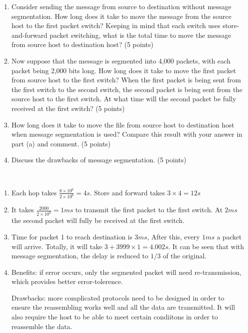 \begin{exercise}[]
{    \begin{enumerate}
        \item Consider sending the message from source to destination without message segmentation. How long does it take to move the message from the source host to the first packet switch? Keeping in mind that each switch uses store-and-forward packet switching, what is the total time to move the message from source host to destination host? (5 points)
        \item  Now suppose that the message is segmented into 4,000 packets, with each packet being 2,000 bits long. How long does it take to move the first packet from source host to the first switch? When the first packet is being sent from the first switch to the second switch, the second packet is being sent from the source host to the first switch. At what time will the second packet be fully received at the first switch? (5 points)
        \item How long does it take to move the file from source host to destination host when message segmentation is used? Compare this result with your answer in part (a) and comment. (5 points)
        \item Discuss the drawbacks of message segmentation. (5 points)
    \end{enumerate}
    }
  \begin{solution}
  \par{~}
  \begin{enumerate}
    \item Each hop takes $\frac{8 \times 10^6}{2\times 10^6} = 4s$. Store and forward takes $3 \times 4 = 12s$
    \item It takes $\frac{2000}{2\times 10^6} = 1ms$ to transmit the first packet to the first switch. At $2ms$ the second packet will fully be received at the first switch.
    \item Time for packet 1 to reach destination is $3ms$, After this, every $1ms$ a packet will arrive. Totally, it will take $3 + 3999 \times 1 = 4.002s$. It can be seen that with message segmentation, the delay is reduced to $1/3$ of the original.
    \item Benefits: if error occurs, only the segmented packet will need re-transmission, which provides better error-tolerence.
    
    Drawbacks: more complicated protocols need to be designed in order to ensure the reassembling works well and all the data are transmitted. It will also require the host to be able to meet certain condiitons in order to reassemble the data.
  \end{enumerate}
  \end{solution}
  \label{ex4}
\end{exercise}


